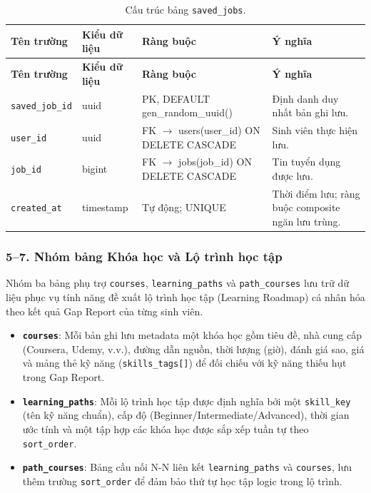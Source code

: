 \begin{footnotesize}\begin{longtable}{|L{3.5cm}|L{2.0cm}|L{3.0cm}|L{5.5cm}|}
\caption{Cấu trúc bảng \texttt{saved\_jobs}.}
\label{tab:saved_jobs} \\
\hline
\textbf{Tên trường} & \textbf{Kiểu dữ liệu} & \textbf{Ràng buộc} & \textbf{Ý nghĩa} \\
\hline
\endfirsthead
\hline
\textbf{Tên trường} & \textbf{Kiểu dữ liệu} & \textbf{Ràng buộc} & \textbf{Ý nghĩa} \\
\hline
\endhead
\texttt{saved\_\allowbreak job\_\allowbreak id} & uuid & PK, DEFAULT gen\_random\_uuid() & Định danh duy nhất bản ghi lưu. \\
\hline
\texttt{user\_id} & uuid & FK $\rightarrow$ users(user\_id) ON DELETE CASCADE & Sinh viên thực hiện lưu. \\
\hline
\texttt{job\_id} & bigint & FK $\rightarrow$ jobs(job\_id) ON DELETE CASCADE & Tin tuyển dụng được lưu. \\
\hline
\texttt{created\_at} & timestamp & Tự động; UNIQUE & Thời điểm lưu; ràng buộc composite ngăn lưu trùng. \\
\hline
\end{longtable}
\end{footnotesize}

\subsubsection*{5--7. Nhóm bảng Khóa học và Lộ trình học tập}

Nhóm ba bảng phụ trợ \texttt{courses}, \texttt{learning\_\allowbreak paths} và \texttt{path\_\allowbreak courses} lưu trữ dữ liệu phục vụ tính năng đề xuất lộ trình học tập (Learning Roadmap) cá nhân hóa theo kết quả Gap Report của từng sinh viên.

\begin{itemize}
    \item \textbf{\texttt{courses}}: Mỗi bản ghi lưu metadata một khóa học gồm tiêu đề, nhà cung cấp (Coursera, Udemy, v.v.), đường dẫn nguồn, thời lượng (giờ), đánh giá sao, giá và mảng thẻ kỹ năng (\texttt{skills\_tags[]}) để đối chiếu với kỹ năng thiếu hụt trong Gap Report.
    \item \textbf{\texttt{learning\_\allowbreak paths}}: Mỗi lộ trình học tập được định nghĩa bởi một \texttt{skill\_key} (tên kỹ năng chuẩn), cấp độ (Beginner/\allowbreak Intermediate/\allowbreak Advanced), thời gian ước tính và một tập hợp các khóa học được sắp xếp tuần tự theo \texttt{sort\_order}.
    \item \textbf{\texttt{path\_\allowbreak courses}}: Bảng cầu nối N-N liên kết \texttt{learning\_\allowbreak paths} và \texttt{courses}, lưu thêm trường \texttt{sort\_order} để đảm bảo thứ tự học tập logic trong lộ trình.
\end{itemize}

